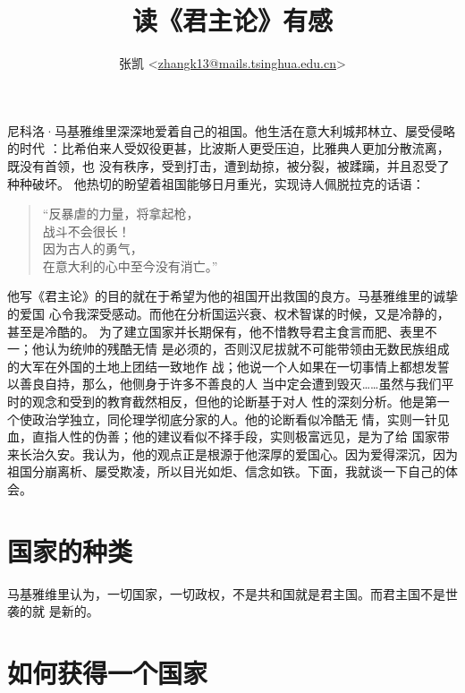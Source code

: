 

\title{\FZLiuKai 读《君主论》有感}
\author{{\FZLiuKai 张凯}
<\href{mailto:zhangk13@mails.tsinghua.edu.cn}{zhangk13@mails.tsinghua.edu.cn}>}


\maketitle
\tableofcontents

\section*{}

尼科洛·马基雅维里深深地爱着自己的祖国。他生活在意大利城邦林立、屡受侵略的时代
：比希伯来人受奴役更甚，比波斯人更受压迫，比雅典人更加分散流离，既没有首领，也
没有秩序，受到打击，遭到劫掠，被分裂，被蹂躏，并且忍受了种种破坏。
\parencite{nikeluo}他热切的盼望着祖国能够日月重光，实现诗人佩脱拉克的话语：
\begin{quote}
  “反暴虐的力量，将拿起枪，\\
  战斗不会很长！\\
  因为古人的勇气，\\
  在意大利的心中至今没有消亡。”
\end{quote}

他写《君主论》的目的就在于希望为他的祖国开出救国的良方。马基雅维里的诚挚的爱国
心令我深受感动。而他在分析国运兴衰、权术智谋的时候，又是冷静的，甚至是冷酷的。
为了建立国家并长期保有，他不惜教导君主食言而肥、表里不一；他认为统帅的残酷无情
是必须的，否则汉尼拔就不可能带领由无数民族组成的大军在外国的土地上团结一致地作
战；他说一个人如果在一切事情上都想发誓以善良自持，那么，他侧身于许多不善良的人
当中定会遭到毁灭……虽然与我们平时的观念和受到的教育截然相反，但他的论断基于对人
性的深刻分析。他是第一个使政治学独立，同伦理学彻底分家的人。他的论断看似冷酷无
情，实则一针见血，直指人性的伪善；他的建议看似不择手段，实则极富远见，是为了给
国家带来长治久安。我认为，他的观点正是根源于他深厚的爱国心。因为爱得深沉，因为
祖国分崩离析、屡受欺凌，所以目光如炬、信念如铁。下面，我就谈一下自己的体会。

\section{国家的种类}

马基雅维里认为，一切国家，一切政权，不是共和国就是君主国。而君主国不是世袭的就
是新的。

\section{如何获得一个国家}

